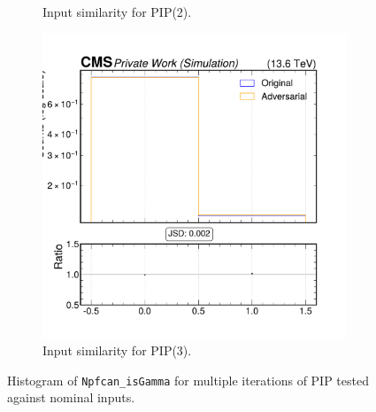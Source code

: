 \begin{figure}[h]
\begin{subfigure}[t]{0.32\textwidth}
    \caption{Input similarity for PIP(2).}
  \end{subfigure}\hfill
  \begin{subfigure}[t]{0.32\textwidth}
    \includegraphics[width=\linewidth]{media/output/features/compare/intprob_3/cmp_npf_arr_Npfcan_isGamma.pdf}
    \caption{Input similarity for PIP(3).}
  \end{subfigure}

  \caption{Histogram of \texttt{Npfcan\_isGamma} for multiple iterations of PIP tested against nominal inputs.}
  \label{fig:intprob_input_Npfcan_isGamma}
\end{figure}